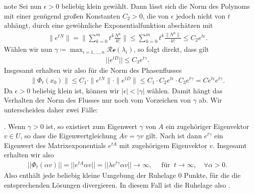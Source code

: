 \documentclass[letterpaper,10pt,german]{jupyterBook}
\begin{document}
\begin{sphinxadmonition}{note}
\sphinxAtStartPar
Sei nun \(\epsilon > 0\) beliebig klein gewählt.
Dann lässt sich die Norm des Polynoms mit einer genügend großen Konstanten \(C_2 > 0\), die von \(\epsilon\) jedoch nicht von \(t\) abhängt, durch eine gewöhnliche Exponentialfunktion abschätzen mit
\begin{equation*}
\begin{split} \|e^{tN}\| = \| \sum_{k=0}^m t^k\frac{N^k}{k!} \| \leq \sum_{k=0}^m t^k \frac{\|N^k\|}{k!} \leq C_2  e^{t \epsilon}.\end{split}
\end{equation*}
\sphinxAtStartPar
Wählen wir nun \(\gamma \coloneqq \max_{i=1,\dots,n} \mathcal{Re}(\lambda_i)\), so folgt direkt, dass gilt
\begin{equation*}
\begin{split}||e^{tD}|| \leq C_3 e^{t\gamma}.\end{split}
\end{equation*}
\sphinxAtStartPar
Insgesamt erhalten wir also für die Norm des Phasenflusses
\begin{equation}\label{equation:odestability/ruhelagen:eq:abschaetzungew}
\begin{split}\|\Phi_t(x_0)\| \leq C_1 \cdot \|e^{tN}\| \cdot \|e^{tD}\| \leq C_1 \cdot C_2 e^{t \epsilon} \cdot C_3 e^{t\gamma} = C e^{t \epsilon} e^{t\gamma}.\end{split}
\end{equation}
\sphinxAtStartPar
Da \(\epsilon > 0\) beliebig klein ist, können wir \(|\epsilon| < |\gamma|\) wählen.
Damit hängt das Verhalten der Norm des Flusses nur noch vom Vorzeichen von \(\gamma\) ab.
Wir unterscheiden daher zwei Fälle:

. Wenn \(\gamma >0\) ist, so existiert zum Eigenwert \(\gamma\) von \(A\) ein zugehöriger Eigenvektor \(v\in U\), so dass die Eigenwertgleichung \(A v = \gamma v\) gilt.
Nach {\hyperref[\detokenize{ode/repetition:lem:mpotew}]{}} ist dann \(e^{t\gamma}\) ein Eigenwert des Matrixexponentials \(e^{tA}\) mit zugehörigem Eigenvektor \(v\).
Insgesamt erhalten wir also
\begin{equation*}
\begin{split}||\Phi_t(\alpha v)|| = ||e^{tA}\alpha v|| = ||\lambda e^{t\gamma} \alpha v|| \to \infty, \quad \text{ für } \ t \to \infty, \quad  \forall \alpha>0. \end{split}
\end{equation*}
\sphinxAtStartPar
Also enthält jede beliebig kleine Umgebung der Ruhelage \(0\) Punkte, für die die entsprechenden Lösungen divergieren.
In diesem Fall ist die Ruhelage also .


\end{sphinxadmonition}
\end{document}
